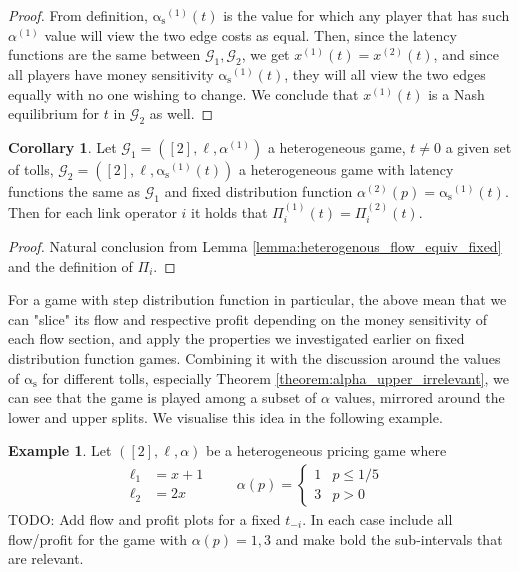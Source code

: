 \documentclass[10pt,a4paper]{book}
\newcommand{\as}{\mathrm{\alpha_s}}
\newcommand{\Gm}{\mathcal{G}}
\theoremstyle{definition}
\newtheorem{corollary}[definition]{Corollary}
\theoremstyle{comment}
\newtheorem{example}[definition]{Example}
\begin{document}
\begin{proof}
	From definition, $\as^{(1)}(t)$ is the value for which any player that has such $\alpha^{(1)}$ value will view the two edge costs as equal.
	Then, since the latency functions are the same between $\Gm_1, \Gm_2$, we get $x^{(1)}(t) = x^{(2)}(t)$, and since all players have money sensitivity $\as^{(1)}(t)$, they will all view the two edges equally with no one wishing to change.
	We conclude that $x^{(1)}(t)$ is a Nash equilibrium for $t$ in $\Gm_2$ as well.
\end{proof}

\begin{corollary}
	\label{corollary:heterogenous_profit_equiv_fixed}
	Let $\Gm_1 = ([2], \ell, \alpha^{(1)})$ a heterogeneous game, $t \ne 0$ a given set of tolls, $\Gm_2 = ([2], \ell, \as^{(1)}(t))$ a heterogeneous game with latency functions the same as $\Gm_1$ and fixed distribution function $\alpha^{(2)}(p) = \as^{(1)}(t)$.
	Then for each link operator $i$ it holds that $\Pi_i^{(1)}(t) = \Pi_i^{(2)}(t)$.
\end{corollary}

\begin{proof}
	Natural conclusion from Lemma \ref{lemma:heterogenous_flow_equiv_fixed} and the definition of $\Pi_i$.
\end{proof}

For a game with step distribution function in particular, the above mean that we can "slice" its flow and respective profit depending on the money sensitivity of each flow section, and apply the properties we investigated earlier on fixed distribution function games.
Combining it with the discussion around the values of $\as$ for different tolls, especially Theorem \ref{theorem:alpha_upper_irrelevant}, we can see that the game is played among a subset of $\alpha$ values, mirrored around the lower and upper splits.
We visualise this idea in the following example.

\begin{example}
	\label{example:a_step_simple}
	Let $([2], \ell, \alpha)$ be a heterogeneous pricing game where
	\begin{align*}
		\begin{aligned}
			\ell_1 &= x + 1 \\
			\ell_2 &= 2x
		\end{aligned}
		\qquad
		\alpha(p) =
		\begin{cases}
			1 & p \le 1 / 5 \\
			3 & p > 0
		\end{cases}&
	\end{align*}
	TODO: Add flow and profit plots for a fixed $t_{-i}$.
	In each case include all flow/profit for the game with $\alpha(p) = 1, 3$ and make bold the sub-intervals that are relevant.
\end{example}
\end{document}
